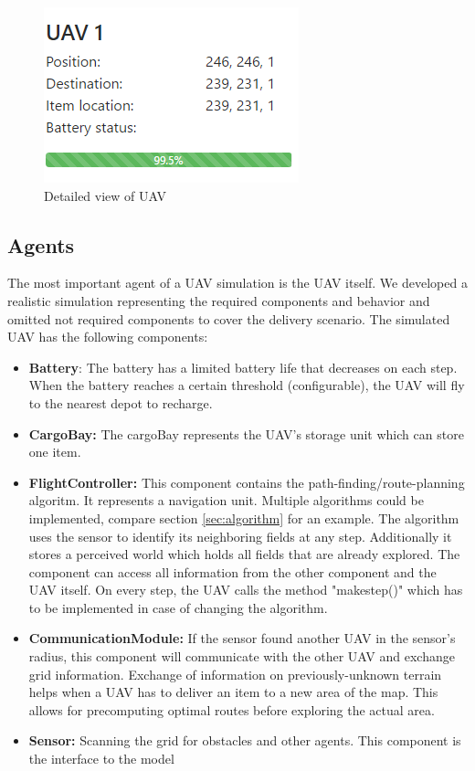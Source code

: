 	\begin{figure}[htbp]\label{fig:uav_detail}
		\centering
		\includegraphics[scale=0.5]{images/uav_detail.png}
		\caption{Detailed view of UAV}
	\end{figure}


\subsection{Agents}\label{sec:UAV}
The most important agent of a UAV simulation is the UAV itself. We developed a realistic simulation representing the required components and behavior and omitted not required components to cover the delivery scenario. The simulated UAV has the following components:
	\begin{itemize}
			\item \textbf{Battery}: The battery has a limited battery life that decreases on each step. When the battery reaches a certain threshold (configurable), the UAV will fly to the nearest depot to recharge.
					\item \textbf{CargoBay:} The cargoBay represents the UAV's storage unit which can store one item.
		\item \textbf{FlightController:} This component contains the path-finding/route-planning algoritm. It represents a navigation unit. Multiple algorithms could be implemented, compare section \ref{sec:algorithm} for an example. The algorithm uses the sensor to identify its neighboring fields at any step. Additionally it stores a perceived world which holds all fields that are already explored. The component can access all information from the other component and the UAV itself. On every step, the UAV calls the method "make\textunderscore step()" which has to be implemented in case of changing the algorithm.
		\item \textbf{CommunicationModule:} If the sensor found another UAV in the sensor's radius, this component will communicate with the other UAV and exchange grid information. Exchange of information on previously-unknown terrain helps when a UAV has to deliver an item to a new area of the map. This allows for precomputing optimal routes before exploring the actual area.
		\item \textbf{Sensor:} Scanning the grid for obstacles and other agents. This component is the interface to the model
	\end{itemize}

